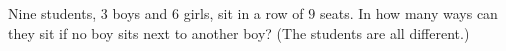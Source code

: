 Nine students, $3$ boys and $6$ girls, sit in a row of $9$ seats. In how many ways can they sit if no boy sits next to another boy? (The students are all different.)
